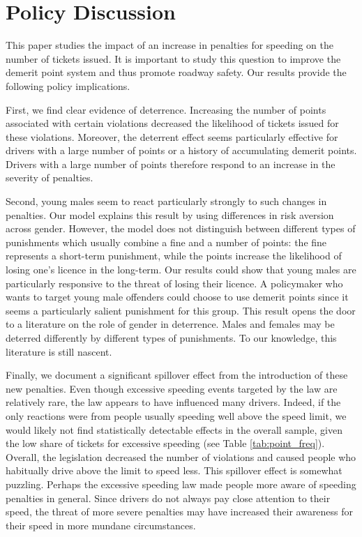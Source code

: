 \section{Policy Discussion}
\label{sec:Discussion}

This paper studies the impact of an increase in penalties for speeding 
on the number of tickets issued. 
It is important to study this question to improve the demerit point system 
and thus promote roadway safety. 
Our results provide the following policy implications.

First, we find clear evidence of deterrence. 
Increasing the number of points associated with certain violations 
decreased the likelihood of tickets issued for these violations. Moreover, the deterrent effect seems particularly effective for drivers with a large number of points or a history of accumulating demerit points. 
Drivers with a large number of points therefore respond to an increase in the severity of penalties.

Second, young males seem to react particularly strongly to such changes in penalties. 
Our model explains this result by using differences in risk aversion across gender. 
However, the model does not distinguish between different types of punishments 
which usually combine a fine and a number of points: 
the fine represents a short-term punishment, 
while the points increase the likelihood of losing one’s licence in the long-term. 
Our results could show that young males are particularly responsive 
to the threat of losing their licence. 
A policymaker who wants to target young male offenders could choose to use demerit points 
since it seems a particularly salient punishment for this group. 
This result opens the door to a literature on the role of gender in deterrence. 
Males and females may be deterred differently by different types of punishments. 
To our knowledge, this literature is still nascent.

Finally, we document a significant spillover effect 
from the introduction of these new penalties. 
Even though excessive speeding events targeted by the law are relatively rare, 
the law appears to have influenced many drivers. 
Indeed, if the only reactions were from people usually speeding well above the speed limit, 
we would likely not find statistically detectable effects in the overall sample, 
given the low share of tickets for excessive speeding 
(see Table \ref{tab:point_freq}). 
Overall, the legislation decreased the number of violations 
and caused people who habitually drive above the limit to speed less. 
This spillover effect is somewhat puzzling. 
Perhaps the excessive speeding law made people more aware of speeding penalties in general. 
Since drivers do not always pay close attention to their speed, 
the threat of more severe penalties may have increased their 
awareness for their speed in more mundane circumstances.



